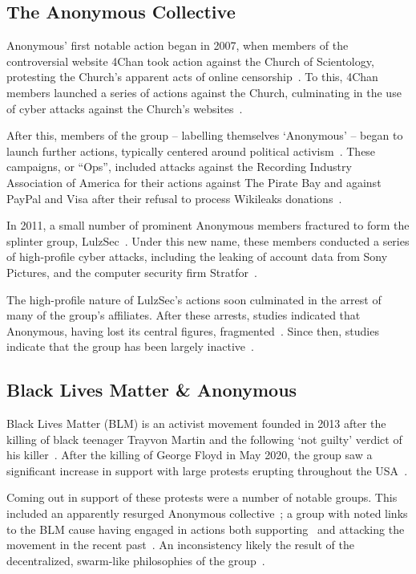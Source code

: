 \documentclass[letterpaper]{article}
\begin{document}
\subsection{The Anonymous Collective}

Anonymous' first notable action began in 2007, when members of the controversial website 4Chan took action against the Church of Scientology, protesting the Church's apparent acts of online censorship~\cite{Olson2013}. To this, 4Chan members launched a series of actions against the Church, culminating in the use of cyber attacks against the Church's websites~\cite{Olson2013}.

After this, members of the group -- labelling themselves `Anonymous' -- began to launch further actions, typically centered around political activism~\cite{Olson2013}. These campaigns, or ``Ops'', included attacks against the Recording Industry Association of America for their actions against The Pirate Bay and against PayPal and Visa after their refusal to process Wikileaks donations~\cite{Uitermark2017}.

In 2011, a small number of prominent Anonymous members fractured to form the splinter group, LulzSec~\cite{Jones2020}. Under this new name, these members conducted a series of high-profile cyber attacks, including the leaking of account data from Sony Pictures, and the computer security firm Stratfor~\cite{Olson2013}.

The high-profile nature of LulzSec's actions soon culminated in the arrest of many of the group's affiliates. After these arrests, studies indicated that Anonymous, having lost its central figures, fragmented~\cite{Olson2013}. Since then, studies indicate that the group has been largely inactive~\cite{Jones2020,Uitermark2017}.

\subsection{Black Lives Matter \& Anonymous}

Black Lives Matter (BLM) is an activist movement founded in 2013 after the killing of black teenager Trayvon Martin and the following `not guilty' verdict of his killer~\cite{Carney2016}. After the killing of George Floyd in May 2020, the group saw a significant increase in support with large protests erupting throughout the USA~\cite{NYT2020}.

Coming out in support of these protests were a number of notable groups. This included an apparently resurged Anonymous collective~\cite{Independant2020}; a group with noted links to the BLM cause having engaged in actions both supporting~\cite{IBT2016} and attacking the movement in the recent past~\cite{Verge2016}. An inconsistency likely the result of the decentralized, swarm-like philosophies of the group~\cite{Uitermark2017}.
\end{document}
